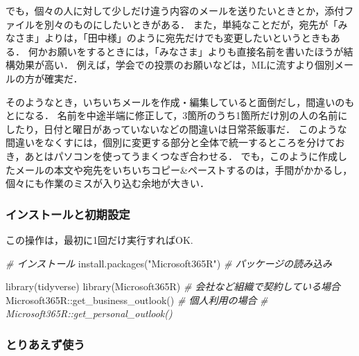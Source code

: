 \documentclass[
]{article}
\newenvironment{Shaded}{\begin{snugshade}}{\end{snugshade}}
\newcommand{\CommentTok}[1]{\textcolor[rgb]{0.56,0.35,0.01}{\textit{#1}}}
\newcommand{\FunctionTok}[1]{\textcolor[rgb]{0.00,0.00,0.00}{#1}}
\newcommand{\NormalTok}[1]{#1}
\newcommand{\SpecialCharTok}[1]{\textcolor[rgb]{0.00,0.00,0.00}{#1}}
\newcommand{\StringTok}[1]{\textcolor[rgb]{0.31,0.60,0.02}{#1}}
\begin{document}
でも，個々の人に対して少しだけ違う内容のメールを送りたいときとか，添付ファイルを別々のものにしたいときがある．
また，単純なことだが，宛先が「みなさま」よりは，「田中様」のように宛先だけでも変更したいというときもある．
何かお願いをするときには，「みなさま」よりも直接名前を書いたほうが結構効果が高い．
例えば，学会での投票のお願いなどは，MLに流すより個別メールの方が確実だ．

そのようなとき，いちいちメールを作成・編集していると面倒だし，間違いのもとになる．
名前を中途半端に修正して，3箇所のうち1箇所だけ別の人の名前にしたり，日付と曜日があっていないなどの間違いは日常茶飯事だ．
このような間違いをなくすには，個別に変更する部分と全体で統一するところを分けておき，あとはパソコンを使ってうまくつなぎ合わせる．
でも，このように作成したメールの本文や宛先をいちいちコピー\&ペーストするのは，手間がかかるし，個々にも作業のミスが入り込む余地が大きい．

\hypertarget{ux30a4ux30f3ux30b9ux30c8ux30fcux30ebux3068ux521dux671fux8a2dux5b9a}{%
\subsubsection{インストールと初期設定}\label{ux30a4ux30f3ux30b9ux30c8ux30fcux30ebux3068ux521dux671fux8a2dux5b9a}}

この操作は，最初に1回だけ実行すればOK.

\begin{Shaded}
\begin{Highlighting}[]
  \CommentTok{\# インストール}
\FunctionTok{install.packages}\NormalTok{(}\StringTok{"Microsoft365R"}\NormalTok{)}
  \CommentTok{\# パッケージの読み込み}
\end{Highlighting}
\end{Shaded}

\begin{Shaded}
\begin{Highlighting}[]
\FunctionTok{library}\NormalTok{(tidyverse)}
\FunctionTok{library}\NormalTok{(Microsoft365R)}
 \CommentTok{\# 会社など組織で契約している場合}
\NormalTok{Microsoft365R}\SpecialCharTok{::}\FunctionTok{get\_business\_outlook}\NormalTok{()}
 \CommentTok{\# 個人利用の場合}
  \CommentTok{\# Microsoft365R::get\_personal\_outlook()}
\end{Highlighting}
\end{Shaded}

\hypertarget{ux3068ux308aux3042ux3048ux305aux4f7fux3046}{%
\subsubsection{とりあえず使う}\label{ux3068ux308aux3042ux3048ux305aux4f7fux3046}}
\end{document}
